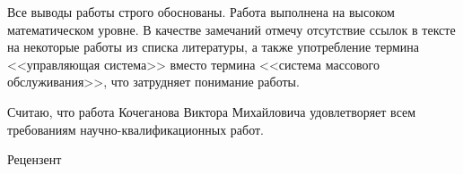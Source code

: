 \documentclass[a4paper,14pt]{extarticle}
\begin{document}
Все выводы работы строго обоснованы. Работа выполнена на высоком
математическом уровне. В качестве замечаний отмечу отсутствие ссылок в тексте на некоторые работы из списка литературы, а также употребление термина <<управляющая система>> вместо термина <<система массового обслуживания>>, что затрудняет понимание работы.

Считаю, что работа Кочеганова Виктора Михайловича удовлетворяет всем требованиям научно-квалификационных работ.  

\bigskip
\bigskip
\noindent

Рецензент
\end{document}
